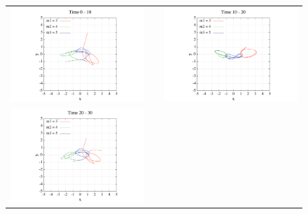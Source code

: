 \documentclass[11pt,a4paper,oneside,onecolumn]{jarticle}
\begin{document}
\begin{figure}[H]
\begin{tabular}{ccc}
\begin{minipage}[t]{0.45\hsize}
\centering
\includegraphics[width=8cm]{./image/pythagoras_orbit_0to10.pdf}
\end{minipage} &
\begin{minipage}[t]{0.1\hsize}
\end{minipage} &
\begin{minipage}[t]{0.45\hsize}
\centering
\includegraphics[width=8cm]{./image/pythagoras_orbit_10to20.pdf}
\end{minipage}\\
%
\begin{minipage}[t]{0.45\hsize}
\centering
\includegraphics[width=8cm]{./image/pythagoras_orbit_20to30.pdf}
\end{minipage} &

\end{tabular}
\end{figure}
\end{document}
